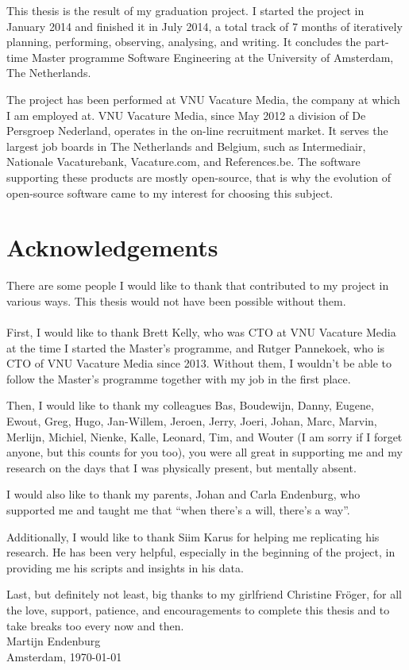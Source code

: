 This thesis is the result of my graduation project. I started the project in
January 2014 and finished it in July 2014, a total track of 7 months of
iteratively planning, performing, observing, analysing, and writing. It
concludes the part-time Master programme Software Engineering at the University
of Amsterdam, The Netherlands.

The project has been performed at VNU Vacature Media, the company at which I am
employed at. VNU Vacature Media, since May 2012 a division of De Persgroep
Nederland, operates in the on-line recruitment market. It serves the largest
job boards in The Netherlands and Belgium, such as Intermediair, Nationale
Vacaturebank, Vacature.com, and References.be. The software supporting these
products are mostly open-source, that is why the evolution of open-source
software came to my interest for choosing this subject.

\section*{Acknowledgements}
There are some people I would like to thank that contributed to my project
in various ways. This thesis would not have been possible without them.

\paragraph{}
First, I would like to thank Brett Kelly, who was CTO at VNU Vacature Media at
the time I started the Master's programme, and Rutger Pannekoek, who is CTO of
VNU Vacature Media since 2013. Without them, I wouldn't be able to follow the
Master's programme together with my job in the first place.

Then, I would like to thank my colleagues Bas,
Boudewijn,
Danny,
Eugene,
Ewout,
Greg,
Hugo,
Jan-Willem,
Jeroen,
Jerry,
Joeri,
Johan,
Marc,
Marvin,
Merlijn,
Michiel,
Nienke,
Kalle,
Leonard,
Tim,
and Wouter (I am sorry if I forget anyone, but this counts for you too), you
were all great in supporting me and my research on the days that I was
physically present, but mentally absent.

I would also like to thank my parents, Johan and Carla Endenburg, who supported
me and taught me that ``when there's a will, there's a way''.

Additionally, I would like to thank Siim Karus for helping me replicating his
research. He has been very helpful, especially in the beginning of the project,
in providing me his scripts and insights in his data.

Last, but definitely not least, big thanks to my girlfriend Christine
Fr\"{o}ger, for all the love, support, patience, and encouragements to complete
this thesis and to take breaks too every now and then.\\[2em]

\noindent
Martijn Endenburg\\
Amsterdam, \today
